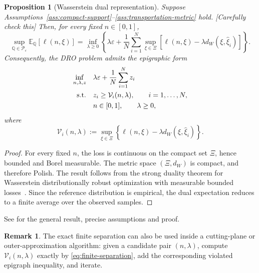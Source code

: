 \documentclass[11pt]{article}
\newcommand{\E}{\mathbb{E}}
\newcommand{\Q}{\mathbb{Q}}
\newcommand{\cP}{\mathcal{P}}
\newcommand{\XiSet}{\Xi}
\newcommand{\eps}{\varepsilon}
\newcommand{\hxi}{\widehat\xi}
\theoremstyle{plain}
\newtheorem{proposition}{Proposition}
\theoremstyle{definition}
\newtheorem{remark}{Remark}
\begin{document}
\begin{proposition}[Wasserstein dual representation] \label{prop:wasserstein-dual} Suppose Assumptions~\ref{ass:compact-support}--\ref{ass:transportation-metric} hold. \color{red}[Carefully check this]\color{black} 
    Then, for every fixed $n\in[0,1]$, \[ \sup_{\Q\in\cP_\eps} \E_\Q[\ell(n,\xi)] = \inf_{\lambda\ge0} \left\{ \lambda\eps + \frac1N\sum_{i=1}^N \sup_{\xi\in\XiSet} \left[ \ell(n,\xi)-\lambda d_W(\xi,\hxi_i) \right] \right\}. \] 
    Consequently, the DRO problem admits the epigraphic form 
    \begin{equation} \label{eq:dro-dual-main} 
        \begin{aligned} \inf_{n,\lambda,z}\quad & \lambda\eps+\frac1N\sum_{i=1}^N z_i \\ \textnormal{s.t.}\quad & z_i\ge \mathcal V_i(n,\lambda), \qquad i=1,\ldots,N, \\ & n\in[0,1], \qquad \lambda\ge0, 
        \end{aligned} 
    \end{equation} where 
    \begin{equation} \label{eq:separation-problem-dual} \mathcal V_i(n,\lambda) := \sup_{\xi\in\XiSet} \left\{ \ell(n,\xi)-\lambda d_W(\xi,\hxi_i) \right\}. \end{equation} 
\end{proposition} 
\begin{proof} For every fixed $n$, the loss is continuous on the compact set $\XiSet$, hence bounded and Borel measurable. 
    The metric space $(\XiSet,d_W)$ is compact, and therefore Polish. 
    The result follows from the strong duality theorem for Wasserstein distributionally robust optimization with measurable bounded losses~\cite{GaoKleywegt2022, ZhangYangGao2025}. 
    Since the reference distribution is empirical, the dual expectation reduces to a finite average over the observed samples. 
\end{proof} 

\color{red}See \cite{GaoKleywegt2022, ZhangYangGao2025} for the general result, precise assumptions and proof.
\color{black}


\begin{remark}
The exact finite separation can also be used inside a cutting-plane or outer-approximation algorithm: given a candidate pair $(n,\lambda)$, compute $\mathcal V_i(n,\lambda)$ exactly by \eqref{eq:finite-separation}, add the corresponding violated epigraph inequality, and iterate. 
\end{remark}
\end{document}
